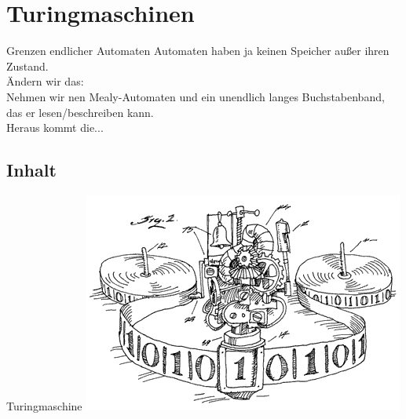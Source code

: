\graphicspath{{../figures/}}

\newenvironment{Messtabelle}[1]
{\begin{minipage}{\linewidth} \centering  \begin{tabular}{#1} }
{\end{tabular} \vspace*{1em} \end{minipage}} 

\section{Turingmaschinen}

\begin{frame}{Grenzen endlicher Automaten}
	Automaten haben ja keinen Speicher außer ihren Zustand. \\
	\medskip
	\impl Ändern wir das: \\
	Nehmen wir nen Mealy-Automaten und ein unendlich langes Buchstabenband, das er lesen/beschreiben kann. \\
	\medskip
	Heraus kommt die...
\end{frame}

\subsection{Inhalt}
\begin{frame}{Turingmaschine}
	\includegraphics[scale=1]{turing/tmAufbau}
\end{frame}

